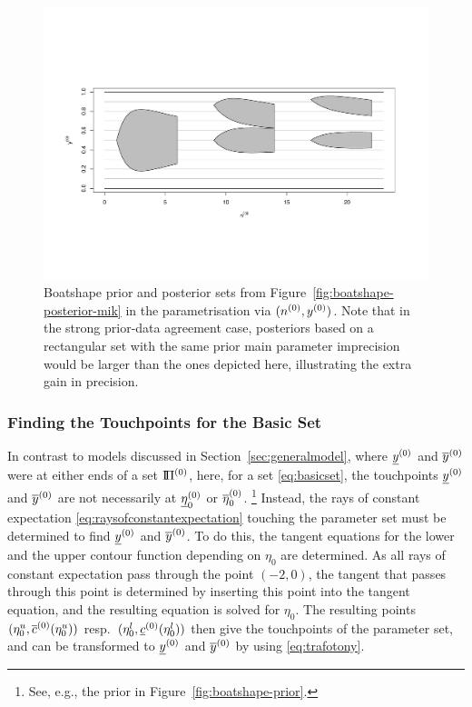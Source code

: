 \begin{figure}  %
\centering
\includegraphics[trim = 15mm 45mm 25mm 60mm, clip, width=\textwidth]{R/boatshape-posterior-normal}%
\caption[Boatshape prior and posterior sets from Figure~\ref{fig:boatshape-posterior-mik} in the parametrisation via $(\nz,\yz)$.]%
{Boatshape prior and posterior sets from Figure~\ref{fig:boatshape-posterior-mik} in the parametrisation via $(\nz,\yz)$.
Note that in the strong prior-data agreement case,
posteriors based on a rectangular set with the same prior main parameter imprecision
would be larger than the ones depicted here, illustrating the extra gain in precision.}
\label{fig:boatshape-posterior-normal}
\end{figure}


\subsubsection{Finding the Touchpoints for the Basic Set}
\label{sec:touchpoints}

In contrast to models discussed in Section~\ref{sec:generalmodel},
where $\underline{y}^{(0)}$ and $\overline{y}^{(0)}$ were at either ends of a set $\text{I}\!\Pi^{(0)}$,
here, for a set \eqref{eq:basicset}, the touchpoints $\underline{y}^{(0)}$ and $\overline{y}^{(0)}$ 
are not necessarily at $\underline{\eta}_0^{(0)}$ or $\overline{\eta}_0^{(0)}$.
\footnote{See, e.g., the prior in Figure~\ref{fig:boatshape-prior}.}
Instead, the rays of constant expectation \eqref{eq:raysofconstantexpectation}
touching the parameter set must be determined to find $\underline{y}^{(0)}$ and $\overline{y}^{(0)}$.
To do this, the tangent equations for the lower and the upper contour function
depending on $\eta_0$ are determined.
As all rays of constant expectation pass through the point $(-2,0)$,
the tangent that passes through this point is determined by inserting this point
into the tangent equation, and the resulting equation is solved for $\eta_0$.
The resulting points $(\eta_0^u,\overline{c}^{(0)}(\eta_0^u))$ resp.\ $(\eta_0^l,\underline{c}^{(0)}(\eta_0^l))$
then give the touchpoints of the parameter set,
and can be transformed to $\underline{y}^{(0)}$ and $\overline{y}^{(0)}$ by using \eqref{eq:trafotony}.

